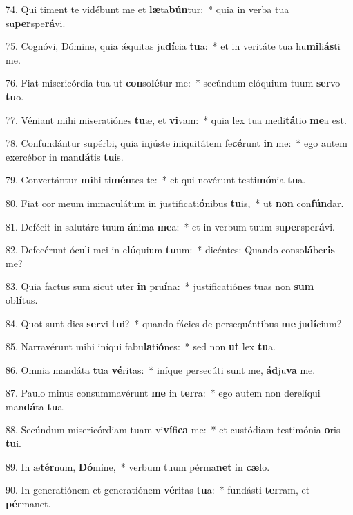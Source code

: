 74. Qui timent te vidébunt me et \textbf{læ}ta\textbf{bún}tur:~*  quia in verba tua su\textbf{per}spe\textbf{rá}vi.\

75. Cognóvi, Dómine, quia ǽquitas ju\textbf{dí}cia \textbf{tu}a:~*  et in veritáte tua hu\textbf{mi}li\textbf{ás}ti me.\

76. Fiat misericórdia tua ut \textbf{con}so\textbf{lé}tur me:~*  secúndum elóquium tuum \textbf{ser}vo \textbf{tu}o.\

77. Véniant mihi miseratiónes \textbf{tu}æ, et \textbf{vi}vam:~*  quia lex tua medi\textbf{tá}tio \textbf{me}a est.\

78. Confundántur supérbi, quia injúste iniquitátem fe\textbf{cé}runt \textbf{in} me:~*  ego autem exercébor in man\textbf{dá}tis \textbf{tu}is.\

79. Convertántur \textbf{mi}hi ti\textbf{mén}tes te:~*  et qui novérunt testi\textbf{mó}nia \textbf{tu}a.\

80. Fiat cor meum immaculátum in justificati\textbf{ó}nibus \textbf{tu}is,~*  ut \textbf{non} con\textbf{fún}dar.\

81. Defécit in salutáre tuum \textbf{á}nima \textbf{me}a:~*  et in verbum tuum su\textbf{per}spe\textbf{rá}vi.\

82. Defecérunt óculi mei in e\textbf{ló}quium \textbf{tu}um:~*  dicéntes: Quando conso\textbf{lá}be\textbf{ris} me?\

83. Quia factus sum sicut uter \textbf{in} pru\textbf{í}na:~*  justificatiónes tuas non \textbf{sum} ob\textbf{lí}tus.\

84. Quot sunt dies \textbf{ser}vi \textbf{tu}i?~*  quando fácies de persequéntibus \textbf{me} ju\textbf{dí}cium?\

85. Narravérunt mihi iníqui fabu\textbf{la}ti\textbf{ó}nes:~*  sed non \textbf{ut} lex \textbf{tu}a.\

86. Omnia mandáta \textbf{tu}a \textbf{vé}ritas:~*  iníque persecúti sunt me, \textbf{ád}ju\textbf{va} me.\

87. Paulo minus consummavérunt \textbf{me} in \textbf{ter}ra:~*  ego autem non derelíqui man\textbf{dá}ta \textbf{tu}a.\

88. Secúndum misericórdiam tuam vi\textbf{ví}fi\textbf{ca} me:~*  et custódiam testimónia \textbf{o}ris \textbf{tu}i.\

89. In æ\textbf{tér}num, \textbf{Dó}mine,~*  verbum tuum pérma\textbf{net} in \textbf{cæ}lo.\

90. In generatiónem et generatiónem \textbf{vé}ritas \textbf{tu}a:~*  fundásti \textbf{ter}ram, et \textbf{pér}manet.\

